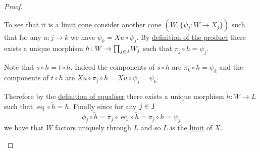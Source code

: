 \documentclass[../../main]{subfiles}
\begin{document}
\begin{proof}
\begin{itemize}
          To see that it is a \hyperref[def:categorical-limit]{limit cone} consider another \hyperref[def:cone]{cone} \((W, \{\psi_{j}\colon W \to X_{j}\})\) such that for any \(u\colon j \to k\) we have \(\psi_{k} = Xu \circ \psi_{j}\).
          By \hyperref[def:categorical-product]{definition of the product} there exists a unique morphism \(h\colon W \to \prod_{j \in \mathsf{J}} W_{j}\) such that \(\pi_{j} \circ h = \psi_{j}\).

          Note that \(s \circ h = t \circ h\). Indeed the components of \(s \circ h\) are \(\pi_{k} \circ h = \psi_{k}\) and the components of \(t \circ h\) are \(Xu \circ \pi_{j} \circ h = Xu \circ \psi_{j} = \psi_{k}\).

          Therefore by the \hyperref[def:equaliser]{definition of equaliser} there exists a unique morphism \(\widetilde{h}\colon W \to L\) such that \(\operatorname{eq} \circ \widetilde{h} = h\).
          Finally since for any \(j \in \mathsf{J}\)
          \begin{equation*}
            \phi_{j} \circ \widetilde{h} = \pi_{j} \circ \operatorname{eq} \circ \widetilde{h} = \pi_{j} \circ h = \psi_{j}
          \end{equation*}
          we have that \(W\) factors uniquely through \(L\) and so \(L\) is the \hyperref[def:categorical-limit]{limit} of \(X\). \qedhere
  \end{itemize}
\end{proof}
\end{document}
